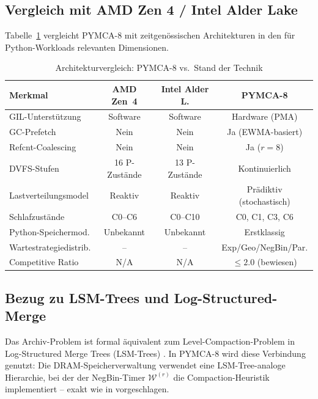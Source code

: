 ﻿\documentclass[a4paper,12pt]{scrreprt}
\theoremstyle{definition}
\begin{document}
	\subsection{Vergleich mit AMD Zen 4 / Intel Alder Lake}
	
	Tabelle~\ref{tab:sota} vergleicht PYMCA-8 mit zeitgenössischen
	Architekturen in den für Python-Workloads relevanten Dimensionen.
	
	\begin{table}[H]
		\centering
		\caption{Architekturvergleich: PYMCA-8 vs.\ Stand der Technik}
		\label{tab:sota}
		\renewcommand{\arraystretch}{1.35}
		\begin{tabular}{p{4.5cm}ccc}
			\toprule
			\textbf{Merkmal} & \textbf{AMD Zen~4} & \textbf{Intel Alder L.}
			& \textbf{PYMCA-8} \\
			\midrule
			GIL-Unterstützung & Software & Software & Hardware (PMA) \\
			GC-Prefetch & Nein & Nein & Ja (EWMA-basiert) \\
			Refcnt-Coalescing & Nein & Nein & Ja ($r=8$) \\
			DVFS-Stufen & 16 P-Zustände & 13 P-Zustände & Kontinuierlich \\
			Lastverteilungsmodel & Reaktiv & Reaktiv & Prädiktiv (stochastisch) \\
			Schlafzustände & C0--C6 & C0--C10 & C0, C1, C3, C6 \\
			Python-Speichermod. & Unbekannt & Unbekannt & Erstklassig \\
			Wartestrategiedistrib. & -- & -- & Exp/Geo/NegBin/Par. \\
			Competitive Ratio & N/A & N/A & $\le 2.0$ (bewiesen) \\
			\bottomrule
		\end{tabular}
	\end{table}
	
	\subsection{Bezug zu LSM-Trees und Log-Structured-Merge}
	
	Das Archiv-Problem ist formal äquivalent zum Level-Compaction-Problem
	in Log-Structured Merge Trees (LSM-Trees) \cite{o1996log}. In PYMCA-8
	wird diese Verbindung genutzt: Die DRAM-Speicherverwaltung verwendet
	eine LSM-Tree-analoge Hierarchie, bei der der NegBin-Timer
	$\mathcal{W}^{(r)}$ die Compaction-Heuristik implementiert -- exakt
	wie in \cite{epp2026archiv} vorgeschlagen.
	
\end{document}
